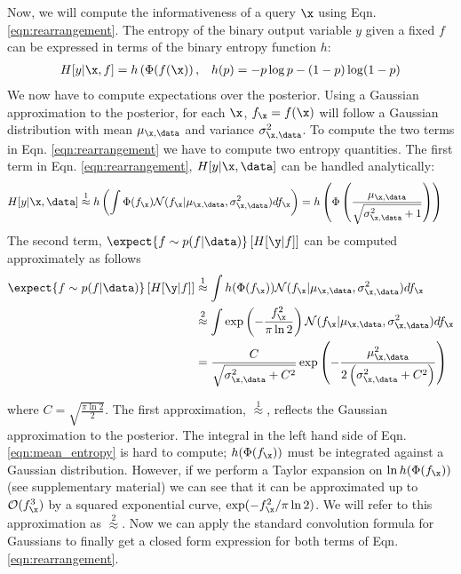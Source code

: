 Now, we will compute the informativeness of a query $\x$ using Eqn.  \eqref{eqn:rearrangement}.  The entropy of the binary output variable $y$ given a fixed $f$ can be expressed in terms of the binary entropy function $h$: 
\begin{align}
H[y\vert\x,f] = h\left(\Phi(f(\x)\right), && h(p)=- p\log p - (1-p)\log(1-p)
\end{align}
We now have to compute expectations over the posterior. Using a Gaussian approximation to the posterior, for each $\x$, $f_{\x} = f(\x)$ will follow a Gaussian distribution with mean $\mu_{\x,\data}$ and variance $\sigma_{\x,\data}^2$. To compute the two terms in Eqn. \eqref{eqn:rearrangement} we have to compute two entropy quantities. The first term in Eqn. \eqref{eqn:rearrangement}, $H[y\vert\x,\data]$ can be handled analytically:
\begin{align}
	H[y\vert\x,\data] &\stackrel{1}{\approx} h\left( \int \Phi( f_{\x} )  \mathcal{N}(f_{\x}\vert \mu_{\x,\data},\sigma_{\x,\data}^2) df_{\x} \right)  = h \left( \Phi\left( \frac{\mu_{\x,\data}}{\sqrt{\sigma^2_{\x,\data} + 1}} \right)\right)\label{ent_mean}
\end{align}
The second term, $\expect{f \sim p(f\vert\data)} \left[ H[\y\vert f] \right]$ can be computed approximately as follows
\begin{align}
	\expect{f \sim p(f\vert\data)} \left[ H[\y\vert f] \right] &\stackrel{1}{\approx}\int h(\Phi(f_{\x})) \mathcal{N}(f_{\x}\vert \mu_{\x,\data},\sigma_{\x,\data}^2)df_{\x}\label{eqn:mean_entropy}\\
	&\stackrel{2}{\approx} \int \exp\left(-\frac{f_{\x}^2}{\pi\ln2}\right) \mathcal{N}(f_{\x}\vert \mu_{\x,\data},\sigma_{\x,\data}^2)df_{\x}\notag\\	
	&= \frac{C}{\sqrt{\sigma_{\x,\data}^2 + C^2}}\exp\left(-\frac{\mu_{\x,\data}^2}{2\left(\sigma_{\x,\data}^2 + C^2\right)}\right)\notag
\end{align}

where $C=\sqrt{\frac{\pi\ln2}{2}}$. The first approximation, {\scriptsize $\stackrel{1}{\approx}$}, reflects the Gaussian approximation to the posterior. The integral in the left hand side of Eqn. \eqref{eqn:mean_entropy} is hard to compute; $h(\Phi(f_{\x}))$ must be integrated against a Gaussian distribution. However, if we perform a Taylor expansion on $\ln h(\Phi(f_{\x}))$ (see supplementary material) we can see that it can be approximated up to $\mathcal{O}(f_{\x}^3)$ by a squared exponential curve, $\exp(-f_{\x}^2/\pi\ln2)$. We will refer to this approximation as {\scriptsize $\stackrel{2}{\approx}$}. Now we can apply the standard convolution formula for Gaussians to finally get a closed form expression for both terms of  Eqn. \eqref{eqn:rearrangement}.

